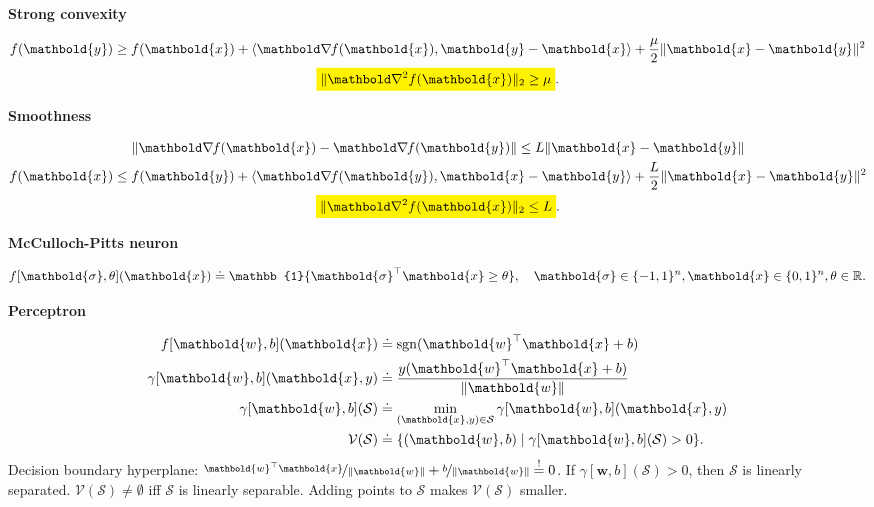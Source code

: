 \documentclass[10pt]{article}
\newenvironment{topic}[1]
{\textbf{\sffamily \footnotesize \colorbox{black}{\rlap{\textbf{\textcolor{white}{#1}}}\hspace{\linewidth}\hspace{-2\fboxsep}}}}
{}
\newenvironment{subtopic}[1]
{\begin{center}\textbf{\footnotesize \sffamily #1}\end{center}}
{}
\renewcommand{\vec}[1]{\ensuremath{\mathbold{#1}}}
\begin{document}
\begin{multicols*}{3}
    \begin{subtopic}{Strong convexity}
        \begin{gather*}
            f(\vec{y}) \geq f(\vec{x}) + \langle \grad{f(\vec{x})}{}, \vec{y} - \vec{x} \rangle + \frac{\mu}{2} \| \vec{x} - \vec{y} \|^2 \\
            \colorbox{yellow}{$\displaystyle \| \hess{f(\vec{x})}{} \|_2 \geq \mu$}.
        \end{gather*}
    \end{subtopic}

    \begin{subtopic}{Smoothness}
        \begin{gather*}
            \| \grad{f(\vec{x})}{} - \grad{f(\vec{y})}{} \| \leq L \| \vec{x} - \vec{y} \|                                                 \\
            f(\vec{x}) \leq f(\vec{y}) + \langle \grad{f(\vec{y})}{}, \vec{x} - \vec{y} \rangle + \frac{L}{2} \| \vec{x} - \vec{y} \|^2 \\
            \colorbox{yellow}{$\displaystyle \| \hess{f(\vec{x})}{} \|_2 \leq L$}.
        \end{gather*}
    \end{subtopic}

    \begin{topic}{Connectionism}

        \begin{subtopic}{McCulloch-Pitts neuron}
            \[
                f[\vec{\sigma},\theta](\vec{x}) \doteq \mathbb{1}\{ \transpose{\vec{\sigma}}\vec{x} \geq \theta \}, \quad \vec{\sigma} \in \{ -1,1 \}^n, \vec{x} \in \{ 0,1 \}^n, \theta \in \R.
            \]
        \end{subtopic}

        \begin{subtopic}{Perceptron}
            \begin{align*}
                f[\vec{w},b](\vec{x})          & \doteq \mathrm{sgn}(\transpose{\vec{w}}\vec{x} + b)                    \\
                \gamma[\vec{w},b](\vec{x},y)   & \doteq \frac{y (\transpose{\vec{w}}\vec{x} + b)}{\| \vec{w} \|}        \\
                \gamma[\vec{w},b](\mathcal{S}) & \doteq \min_{(\vec{x},y) \in \mathcal{S}} \gamma[\vec{w},b](\vec{x},y) \\
                \mathcal{V}(\mathcal{S})       & \doteq \{ (\vec{w},b) \mid \gamma[\vec{w},b](\mathcal{S}) > 0 \}.
            \end{align*}
            Decision boundary hyperplane: $\nicefrac{\transpose{\vec{w}} \vec{x}}{\| \vec{w} \|} + \nicefrac{b}{\| \vec{w} \|}
                \overset{!}{=} 0$. If $\gamma[\vec{w},b](\mathcal{S}) > 0$, then $\mathcal{S}$ is
            linearly separated. $\mathcal{V}(\mathcal{S}) \neq \emptyset$ iff $\mathcal{S}$ is
            linearly separable. Adding points to $\mathcal{S}$ makes $\mathcal{V}(\mathcal{S})$ smaller.


\end{subtopic}
\end{topic}
\end{multicols*}
\end{document}
